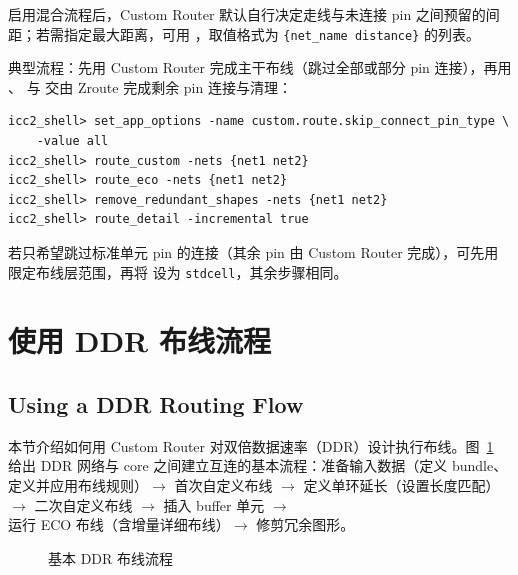 启用混合流程后，Custom Router 默认自行决定走线与未连接 pin 之间预留的间距；若需指定最大距离，可用 ，取值格式为 \texttt{\{net\_name distance\}} 的列表。

典型流程：先用 Custom Router 完成主干布线（跳过全部或部分 pin 连接），再用 、 与  交由 Zroute 完成剩余 pin 连接与清理：

\begin{lstlisting}
icc2_shell> set_app_options -name custom.route.skip_connect_pin_type \
    -value all
icc2_shell> route_custom -nets {net1 net2}
icc2_shell> route_eco -nets {net1 net2}
icc2_shell> remove_redundant_shapes -nets {net1 net2}
icc2_shell> route_detail -incremental true
\end{lstlisting}

若只希望跳过标准单元 pin 的连接（其余 pin 由 Custom Router 完成），可先用  限定布线层范围，再将  设为 \texttt{stdcell}，其余步骤相同。

\section{使用 DDR 布线流程}
\subsection*{Using a DDR Routing Flow}

本节介绍如何用 Custom Router 对双倍数据速率（DDR）设计执行布线。图~\ref{fig:ddr-basic-flow} 给出 DDR 网络与 core 之间建立互连的基本流程：准备输入数据（定义 bundle、定义并应用布线规则）$\to$ 首次自定义布线 $\to$ 定义单环延长（设置长度匹配）$\to$ 二次自定义布线 $\to$ 插入 buffer 单元 $\to$ 运行 ECO 布线（含增量详细布线）$\to$ 修剪冗余图形。

\begin{figure}[htbp]
\centering
{}
\caption{基本 DDR 布线流程}
\label{fig:ddr-basic-flow}
\end{figure}

